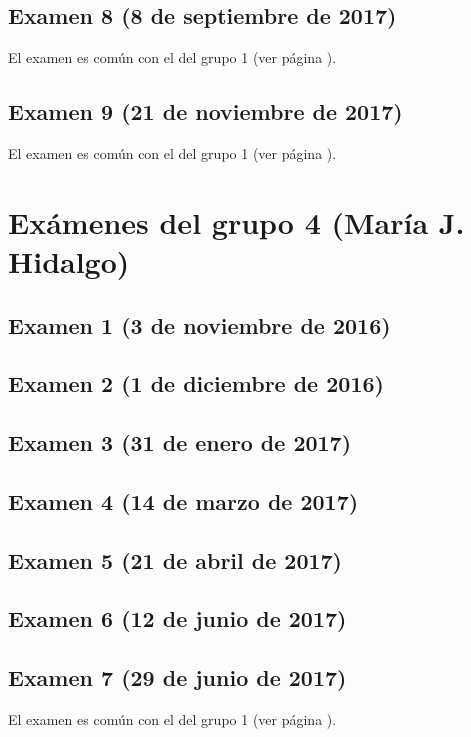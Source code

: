 \documentclass[a4paper,12pt,twoside]{book}
\begin{document}
\subsection{Examen 8 (8 de septiembre de 2017)}
El examen es común con el del grupo 1 (ver página \pageref{examen_16_17_4_8}).
\subsection{Examen 9 (21 de noviembre de 2017)}
El examen es común con el del grupo 1 (ver página \pageref{examen_16_17_4_9}).

\section{Exámenes del grupo 4 (María J. Hidalgo)}
\subsection{Examen 1 (3 de noviembre de 2016)}
\subsection{Examen 2 (1 de diciembre de 2016)}
\subsection{Examen 3 (31 de enero de 2017)}
 \label{examen_16_17_1_3}
\subsection{Examen 4 (14 de marzo de 2017)}
\subsection{Examen 5 (21 de abril de 2017)}
\subsection{Examen 6 (12 de junio de 2017)}
 \label{examen_16_17_1_6}
\subsection{Examen 7 (29 de junio de 2017)}
El examen es común con el del grupo 1 (ver página \pageref{examen_16_17_4_7}).
\end{document}
